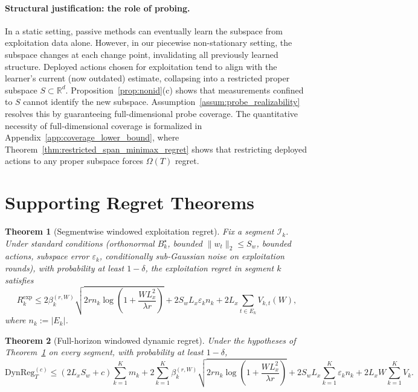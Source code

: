 \documentclass{article}
\newcommand{\R}{\mathbb{R}}
\newcommand{\cI}{\mathcal{I}}
\newcommand{\DynReg}{\mathrm{DynReg}}
\newtheorem{theorem}{Theorem}
\begin{document}
\paragraph{Structural justification: the role of probing.}
In a static setting, passive methods can eventually learn the subspace from exploitation data alone.
However, in our piecewise non-stationary setting, the subspace changes at each change point, invalidating all previously learned structure.
Deployed actions chosen for exploitation tend to align with the learner's current (now outdated) estimate, collapsing into a restricted proper subspace $S \subset \R^d$.
Proposition~\ref{prop:nonid}(c) shows that measurements confined to $S$ cannot identify the new subspace.
Assumption~\ref{assum:probe_realizability} resolves this by guaranteeing full-dimensional probe coverage.
The quantitative necessity of full-dimensional coverage is formalized in Appendix~\ref{app:coverage_lower_bound}, where Theorem~\ref{thm:restricted_span_minimax_regret} shows that restricting deployed actions to any proper subspace forces $\Omega(T)$ regret.

\section{Supporting Regret Theorems}
\label{app:supporting_regret}

\begin{theorem}[Segmentwise windowed exploitation regret]
\label{thm:segment_windowed_projected}
Fix a segment $\cI_k$. Under standard conditions (orthonormal $B_k^\star$, bounded $\|w_t\|_2 \le S_w$, bounded actions, subspace error $\varepsilon_k$, conditionally sub-Gaussian noise on exploitation rounds), with probability at least $1-\delta$, the exploitation regret in segment $k$ satisfies
\[
R_k^{\mathrm{exp}} \le
2\beta_k^{(r,W)}
\sqrt{2r n_k \log\!\left(1+\frac{W L_x^2}{\lambda r}\right)}
+ 2S_wL_x \varepsilon_k n_k
+ 2L_x \sum_{t\in E_k} V_{k,t}(W),
\]
where $n_k:=|E_k|$.
\end{theorem}

\begin{theorem}[Full-horizon windowed dynamic regret]
\label{thm:full_horizon_windowed}
Under the hypotheses of Theorem~\ref{thm:segment_windowed_projected} on every segment, with probability at least $1-\delta$,
\[
\DynReg_T^{(c)} \le
(2L_xS_w+c)\sum_{k=1}^K m_k
+ 2\sum_{k=1}^K \beta_k^{(r,W)}
\sqrt{2r n_k \log\!\left(1+\frac{W L_x^2}{\lambda r}\right)}
+ 2S_wL_x \sum_{k=1}^K \varepsilon_k n_k
+ 2L_xW \sum_{k=1}^K V_k.
\]
\end{theorem}
\end{document}
